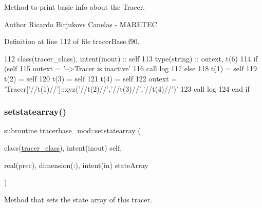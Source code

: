 Method to print basic info about the Tracer. 

\begin{DoxyAuthor}{Author}
Ricardo Birjukovs Canelas -\/ M\+A\+R\+E\+T\+EC 
\end{DoxyAuthor}


Definition at line 112 of file tracer\+Base.\+f90.


\begin{DoxyCode}
112     \textcolor{keywordtype}{class}(tracer\_class), \textcolor{keywordtype}{intent(inout)} :: self
113     \textcolor{keywordtype}{type}(string) :: outext, t(6)
114     \textcolor{keywordflow}{if} (self%
115         outext = \textcolor{stringliteral}{'-->Tracer is inactive'}
116         \textcolor{keyword}{call }log%
117     \textcolor{keywordflow}{else}
118         t(1) = self%
119         t(2) = self%
120         t(3) = self%
121         t(4) = self%
122         outext = \textcolor{stringliteral}{'Tracer['}//t(1)//\textcolor{stringliteral}{']::xyz('}//t(2)//\textcolor{stringliteral}{','}//t(3)//\textcolor{stringliteral}{','}//t(4)//\textcolor{stringliteral}{')'}
123         \textcolor{keyword}{call }log%
124 \textcolor{keywordflow}{    end if}
\end{DoxyCode}
\mbox{\label{namespacetracerbase__mod_af85802e927b07e777b94375550246c16}} 
\subsubsection{\texorpdfstring{setstatearray()}{setstatearray()}}
{\footnotesize\ttfamily subroutine tracerbase\+\_\+mod\+::setstatearray (\begin{DoxyParamCaption}\item[{class(\mbox{\hyperlink{structtracerbase__mod_1_1tracer__class}{tracer\+\_\+class}}), intent(inout)}]{self,  }\item[{real(prec), dimension(\+:), intent(in)}]{state\+Array }\end{DoxyParamCaption})\hspace{0.3cm}{\ttfamily [private]}}



Method that sets the state array of this tracer. 

